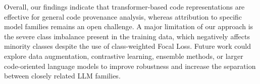 \documentclass[11pt]{article}
\begin{document}
Overall, our findings indicate that transformer-based code representations are effective for general code provenance analysis, whereas attribution to specific model families remains an open challenge. A major limitation of our approach is the severe class imbalance present in the training data, which negatively affects minority classes despite the use of class-weighted Focal Loss. Future work could explore data augmentation, contrastive learning, ensemble methods, or larger code-oriented language models to improve robustness and  increase the separation between closely related LLM families.

\newpage

\end{document}
